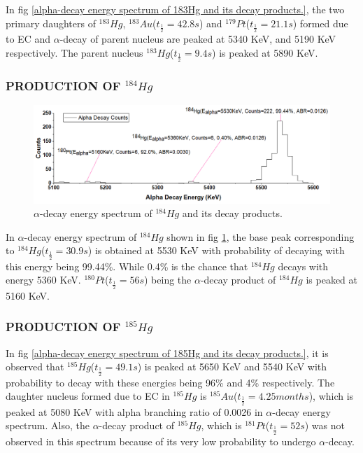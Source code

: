 \documentclass[12pt]{article}
\begin{document}
In fig \ref{alpha-decay energy spectrum of 183Hg and its decay products.}, the two primary daughters of $^{183}Hg$, $^{183}Au$($t_\frac{1}{2}=42.8s$) and $^{179}Pt$($t_\frac{1}{2}=21.1s$) formed due to EC and $\alpha$-decay of parent nucleus are peaked at 5340 KeV, and 5190 KeV respectively. The parent nucleus $^{183}Hg$($t_\frac{1}{2}=9.4s$) is peaked at 5890 KeV.


\subsubsection{PRODUCTION OF $^{184}Hg$}
\begin{figure}[h]
\centering
\includegraphics[scale=0.49]{Hg184.png}
\caption{$\alpha$-decay energy spectrum of $^{184}Hg$ and its decay products.}
\label{alpha-decay energy spectrum of 184Hg and its decay products.}
\end{figure}

In $\alpha$-decay energy spectrum of $^{184}Hg$ shown in fig \ref{alpha-decay energy spectrum of 184Hg and its decay products.}, the base peak corresponding to $^{184}Hg$($t_\frac{1}{2}=30.9s$) is obtained at 5530 KeV with probability of decaying with this energy being 99.44\%. While 0.4\% is the chance that $^{184}Hg$ decays with energy 5360 KeV. $^{180}Pt$($t_\frac{1}{2}=56s$) being the $\alpha$-decay product of $^{184}Hg$ is peaked at 5160 KeV. 


\subsubsection{PRODUCTION OF $^{185}Hg$}
In fig \ref{alpha-decay energy spectrum of 185Hg and its decay products.}, it is observed that $^{185}Hg$($t_\frac{1}{2}=49.1s$) is peaked at 5650 KeV and 5540 KeV with probability to decay with these energies being 96\% and 4\% respectively. The daughter nucleus formed due to EC in $^{185}Hg$ is $^{185}Au$($t_\frac{1}{2}=4.25 months$), which is peaked at 5080 KeV with alpha branching ratio of 0.0026 in $\alpha$-decay energy spectrum. Also, the $\alpha$-decay product of $^{185}Hg$, which is $^{181}Pt$($t_\frac{1}{2}=52s$) was not observed in this spectrum because of its very low probability to undergo $\alpha$-decay. 
\clearpage
\end{document}
